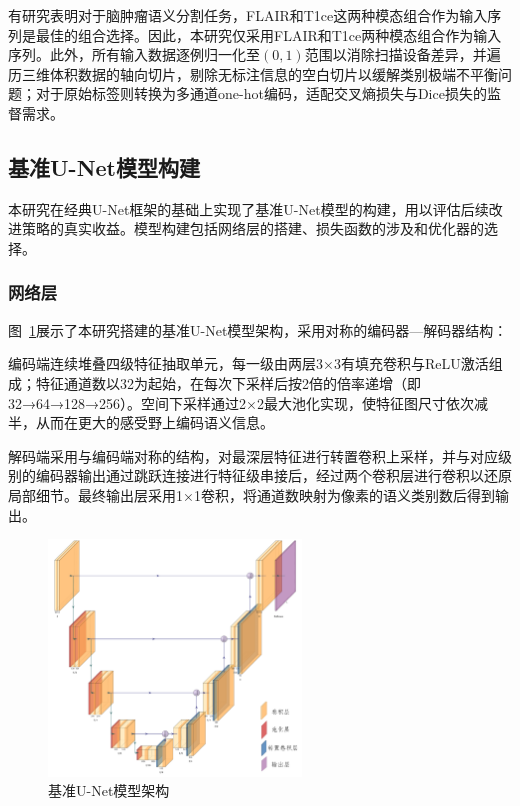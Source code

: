 有研究表明对于脑肿瘤语义分割任务，FLAIR和T1ce这两种模态组合作为输入序列是最佳的组合选择\cite{buchner2023}。因此，本研究仅采用FLAIR和T1ce两种模态组合作为输入序列。此外，所有输入数据逐例归一化至$(0,1)$范围以消除扫描设备差异，并遍历三维体积数据的轴向切片，剔除无标注信息的空白切片以缓解类别极端不平衡问题；对于原始标签则转换为多通道one-hot编码，适配交叉熵损失与Dice损失的监督需求。

\subsection{基准U-Net模型构建}

本研究在经典U-Net框架的基础上实现了基准U-Net模型的构建，用以评估后续改进策略的真实收益。模型构建包括网络层的搭建、损失函数的涉及和优化器的选择。

\subsubsection{网络层}

图~\ref{fig:unet_ushape}展示了本研究搭建的基准U-Net模型架构，采用对称的编码器—解码器结构：

编码端连续堆叠四级特征抽取单元，每一级由两层3×3有填充卷积与ReLU激活组成；特征通道数以32为起始，在每次下采样后按2倍的倍率递增（即32→64→128→256）。空间下采样通过2×2最大池化实现，使特征图尺寸依次减半，从而在更大的感受野上编码语义信息。

解码端采用与编码端对称的结构，对最深层特征进行转置卷积上采样，并与对应级别的编码器输出通过跳跃连接进行特征级串接后，经过两个卷积层进行卷积以还原局部细节。最终输出层采用1×1卷积，将通道数映射为像素的语义类别数后得到输出。

\begin{figure}[h]
    \centering
    \includegraphics[width=0.6\textwidth]{fig/Unet_ushape.png}
    \caption{基准U-Net模型架构}
    \label{fig:unet_ushape}
\end{figure}

